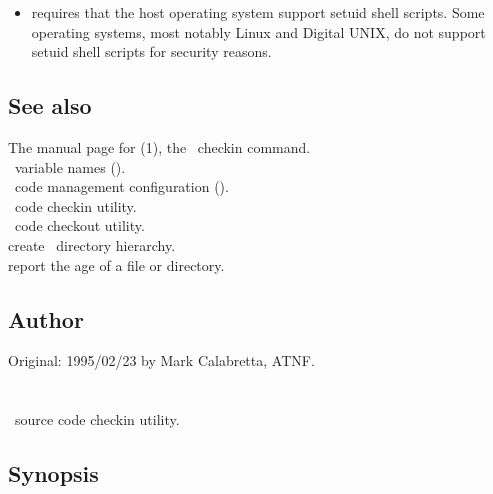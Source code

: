 \begin{itemize}
\item
    requires that the host operating system support setuid shell
   scripts.  Some operating systems, most notably Linux and Digital
   UNIX, do not support setuid shell scripts for security reasons.
\end{itemize}

\subsection*{See also}

The manual page for (1), the \rcs\ checkin command.\\
\aipspp\ variable names ().\\
\aipspp\ code management configuration ().\\
 \aipspp\ code checkin utility.\\
 \aipspp\ code checkout utility.\\
 create \aipspp\ directory hierarchy.\\
 report the age of a file or directory.

\subsection*{Author}

Original: 1995/02/23 by Mark Calabretta, ATNF.


\section{}
\label{ai}

\aipspp\ source code checkin utility.

\subsection*{Synopsis}

\begin{synopsis}
\end{synopsis}

